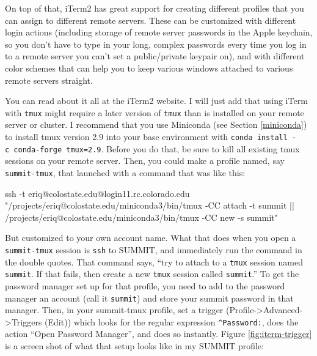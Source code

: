 \documentclass[]{krantz}
\makeatletter
\newenvironment{Shaded}{\begin{snugshade}}{\end{snugshade}}
\newcommand{\FunctionTok}[1]{\textcolor[rgb]{0,0,0}{#1}}
\newcommand{\NormalTok}[1]{#1}
\newcommand{\StringTok}[1]{\textcolor[rgb]{0.5,0.5,0.5}{#1}}
\newenvironment{kframe}{%
\medskip{}
\setlength{\fboxsep}{.8em}
 \def\at@end@of@kframe{}%
 \ifinner\ifhmode%
  \def\at@end@of@kframe{\end{minipage}}%
  \begin{minipage}{\columnwidth}%
 \fi\fi%
 \def\FrameCommand##1{\hskip\@totalleftmargin \hskip-\fboxsep
 \colorbox{shadecolor}{##1}\hskip-\fboxsep
     \hskip-\linewidth \hskip-\@totalleftmargin \hskip\columnwidth}%
 \MakeFramed {\advance\hsize-\width
   \@totalleftmargin\z@ \linewidth\hsize
   \@setminipage}}%
 {\par\unskip\endMakeFramed%
 \at@end@of@kframe}
\renewenvironment{Shaded}{\begin{kframe}}{\end{kframe}}
\makeatother
\begin{document}
On top of that, iTerm2 has great support for creating different profiles that you can
assign to different remote servers. These can be customized with different login actions
(including storage of remote server passwords in the Apple keychain, so you don't have
to type in your long, complex passwords every time you log in to a remote server you
can't set a public/private keypair on), and with different color schemes that can help you
to keep various windows attached to various remote servers straight.

You can read about it all at the iTerm2 website. I will just add that using
iTerm with \texttt{tmux} might require a later version of \texttt{tmux} than is installed
on your remote server or cluster. I recommend that you use Miniconda (see Section \ref{miniconda})
to install tmux version 2.9 into your base environment with \texttt{conda\ install\ -c\ conda-forge\ tmux=2.9}.
Before you do that, be sure to kill all existing tmux sessions on your remote server.
Then, you could make a profile named, say \texttt{summit-tmux}, that launched with a command
that was like this:

\begin{Shaded}
\begin{Highlighting}[]
\FunctionTok{ssh}\NormalTok{ -t eriq@colostate.edu@login11.rc.colorado.edu }\StringTok{"/projects/eriq@colostate.edu/miniconda3/bin/tmux -CC attach -t summit || /projects/eriq@colostate.edu/miniconda3/bin/tmux -CC new -s summit"}
\end{Highlighting}
\end{Shaded}

But customized to your own account name. What that does when you open a \texttt{summit-tmux} session is
\texttt{ssh} to SUMMIT, and immediately run the command in the double quotes. That command says,
``try to attach to a \texttt{tmux} session named \texttt{summit}. If that fails, then create a new
\texttt{tmux} session called \texttt{summit}.'' To get the password manager set up for that profile,
you need to add to the password manager an account (call it \texttt{summit}) and store your summit
password in that manager. Then, in your summit-tmux profile, set a trigger (Profile-\textgreater{}Advanced-\textgreater{}Triggers (Edit))
which looks for the regular expression \texttt{\^{}Password:}, does the action ``Open Password Manager'', and does so
instantly. Figure \ref{fig:iterm-trigger} is a screen shot of what that setup looks like in my SUMMIT profile:
\end{document}
